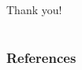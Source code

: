 \documentclass[11pt]{beamer}
\begin{document}

\begin{frame}{}

\centering
\huge Thank you!

\end{frame}



\section*{}
\begin{frame}[noframenumbering, shrink=10]
    \frametitle{References}
    
\end{frame}
\end{document}
